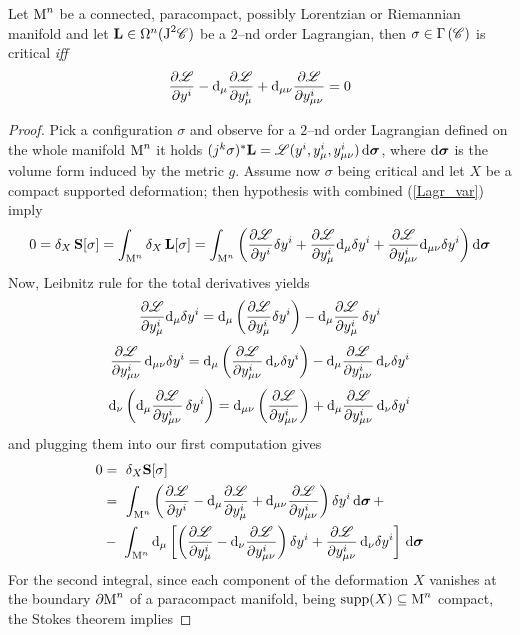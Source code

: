 \begin{teo}\label{least_action}
Let $\text{\normalfont M}^n$ be a connected, paracompact, possibly Lorentzian or Riemannian  manifold and let $\mathbf{L}\in\Omega^n(\text{\normalfont J}^2\mathscr{C})$ be a $2$--nd order Lagrangian, then $\sigma\in\Gamma\left(\mathscr{C}\right)$ is critical \emph{iff} 
    $$\frac{\partial\mathscr{L}}{\partial y^i}-\text{\normalfont d}_\mu\frac{\partial\mathscr{L}}{\partial y^i_\mu}+\text{\normalfont d}_{\mu\nu}\frac{\partial\mathscr{L}}{\partial y^i_{\mu\nu}}=0$$
\end{teo}
\begin{proof}
Pick a configuration $\sigma$ and observe for a $2$--nd order Lagrangian defined on the whole manifold $\text{\normalfont M}^n$ it holds $(j^k\sigma)^*\mathbf{L}=\mathscr{L}(y^i,y^i_\mu,y^i_{\mu\nu})\,\text{\normalfont d}\boldsymbol{\sigma}$, where $\text{\normalfont d}\boldsymbol{\sigma}$ is the volume form induced by the metric $g$. Assume now $\sigma$ being critical and let $X$ be a compact supported deformation; then hypothesis with combined (\ref{Lagr_var}) imply
$$0=\delta_X\,\mathbf{S}[\sigma]=\int_{\text{\normalfont M}^n}\delta_X\,\mathbf{L}[\sigma]=\int_{\text{\normalfont M}^n}\left(\frac{\partial\mathscr{L}}{\partial y^i}\delta y^i+\frac{\partial\mathscr{L}}{\partial y^i_\mu}\text{\normalfont d}_\mu\delta y^i+\frac{\partial\mathscr{L}}{\partial y^i_{\mu\nu}}\text{\normalfont d}_{\mu\nu}\delta y^i\right)\text{\normalfont d}\boldsymbol{\sigma}$$
Now, Leibnitz rule for the total derivatives yields
$$\frac{\partial\mathscr{L}}{\partial y^i_\mu}\text{\normalfont d}_\mu\delta y^i=\text{\normalfont d}_\mu\left(\frac{\partial\mathscr{L}}{\partial y^i_\mu}\delta y^i\right)-\text{\normalfont d}_\mu\frac{\partial\mathscr{L}}{\partial y^i_\mu}\,\delta y^i$$
$$\frac{\partial\mathscr{L}}{\partial y^i_{\mu\nu}}\,\text{\normalfont d}_{\mu\nu}\delta y^i=\text{\normalfont d}_\mu\left(\frac{\partial\mathscr{L}}{\partial y^i_{\mu\nu}}\,\text{\normalfont d}_\nu\delta y^i\right)-\text{\normalfont d}_\mu\frac{\partial\mathscr{L}}{\partial y^i_{\mu\nu}}\,\text{\normalfont d}_\nu\delta y^i$$
$$\text{\normalfont d}_\nu\left(\text{\normalfont d}_\mu\frac{\partial\mathscr{L}}{\partial y^i_{\mu\nu}}\,\delta y^i\right)=\text{\normalfont d}_{\mu\nu}\left(\frac{\partial\mathscr{L}}{\partial y^i_{\mu\nu}}\right)+\text{\normalfont d}_\mu\frac{\partial\mathscr{L}}{\partial y^i_{\mu\nu}}\,\text{\normalfont d}_\nu\delta y^i$$
and plugging them into our first computation gives
\begin{align*}
    0&=\,\,\delta_X\mathbf{S}[\sigma]\\
    &=\,\,\int_{\text{\normalfont M}^n}\left(\frac{\partial\mathscr{L}}{\partial y^i}-\text{\normalfont d}_\mu\frac{\partial\mathscr{L}}{\partial y^i_\mu}+\text{\normalfont d}_{\mu\nu}\frac{\partial\mathscr{L}}{\partial y^i_{\mu\nu}}\right)\delta y^i\,\text{\normalfont d}\boldsymbol{\sigma}\,+\\
    &-\,\,\int_{\text{\normalfont M}^n}\text{\normalfont d}_\mu\left[\left(\frac{\partial\mathscr{L}}{\partial y^i_\mu}-\text{\normalfont d}_\nu\frac{\partial\mathscr{L}}{\partial y^i_{\mu\nu}}\right)\delta y^i+\frac{\partial\mathscr{L}}{\partial y^i_{\mu\nu}}\,\text{\normalfont d}_\nu\delta y^i\right]\,\text{\normalfont d}\boldsymbol{\sigma}
\end{align*}
For the second integral, since each component of the deformation $X$ vanishes at the boundary $\partial\text{\normalfont M}^n$ of a paracompact manifold, being $\text{\normalfont supp}(X)\subseteq\text{\normalfont M}^n$ compact, the Stokes theorem implies

\end{proof}
